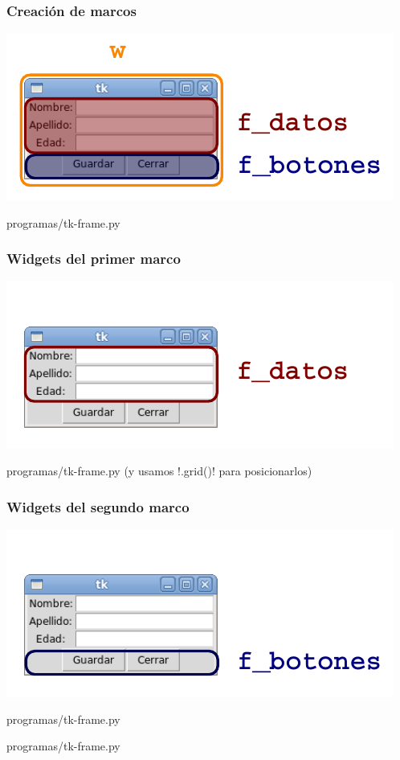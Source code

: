 \documentclass[12pt]{beamer}
\begin{document}
  \begin{frame}
    \label{marcos-0}
    \frametitle{Creación de marcos}
    \begin{center}
      \includegraphics[width=.7\textwidth]{programas/tkinter/capturas/13-0.pdf}
    \end{center}
    
            {programas/tk-frame.py}
    \vfill
  \end{frame}

  \begin{frame}
    \label{marcos-1}
    \frametitle{Widgets del primer marco}
    \begin{center}
      \includegraphics[width=.7\textwidth]{programas/tkinter/capturas/13-1.pdf}
    \end{center}
    
            {programas/tk-frame.py}
    \vfill
    (y usamos \li!.grid()! para posicionarlos)
  \end{frame}

  \begin{frame}
    \label{marcos-2}
    \frametitle{Widgets del segundo marco}
    \begin{center}
      \includegraphics[width=.7\textwidth]{programas/tkinter/capturas/13-2.pdf}
    \end{center}
    
            {programas/tk-frame.py}
    
            {programas/tk-frame.py}
    \vfill
  \end{frame}
\end{document}
